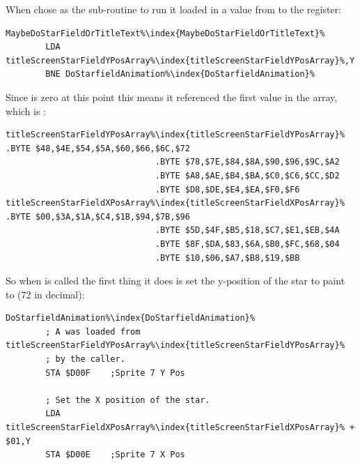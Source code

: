 When  chose  as the sub-routine to run it loaded in a value
from  to the  register: 

\begin{lstlisting}[escapechar=\%]
MaybeDoStarFieldOrTitleText%\index{MaybeDoStarFieldOrTitleText}%   
        LDA titleScreenStarFieldYPosArray%\index{titleScreenStarFieldYPosArray}%,Y
        BNE DoStarfieldAnimation%\index{DoStarfieldAnimation}%
\end{lstlisting}

Since  is zero at this point this means it referenced the first value in the array, which is :
\begin{lstlisting}[escapechar=\%]
titleScreenStarFieldYPosArray%\index{titleScreenStarFieldYPosArray}% .BYTE $48,$4E,$54,$5A,$60,$66,$6C,$72
                              .BYTE $78,$7E,$84,$8A,$90,$96,$9C,$A2
                              .BYTE $A8,$AE,$B4,$BA,$C0,$C6,$CC,$D2
                              .BYTE $D8,$DE,$E4,$EA,$F0,$F6
titleScreenStarFieldXPosArray%\index{titleScreenStarFieldXPosArray}% .BYTE $00,$3A,$1A,$C4,$1B,$94,$7B,$96
                              .BYTE $5D,$4F,$B5,$18,$C7,$E1,$EB,$4A
                              .BYTE $8F,$DA,$83,$6A,$B0,$FC,$68,$04
                              .BYTE $10,$06,$A7,$B8,$19,$BB
\end{lstlisting}

So when  is called the first thing it does is set the y-position of the star to paint
to  (72 in decimal): 

\begin{lstlisting}[caption=The start of \icode{DoStarfieldAnimation\index{DoStarfieldAnimation}} responsible for painting stars.,escapechar=\%]
DoStarfieldAnimation%\index{DoStarfieldAnimation}%   
        ; A was loaded from titleScreenStarFieldYPosArray%\index{titleScreenStarFieldYPosArray}%
        ; by the caller.
        STA $D00F    ;Sprite 7 Y Pos

        ; Set the X position of the star.
        LDA titleScreenStarFieldXPosArray%\index{titleScreenStarFieldXPosArray}% + $01,Y
        STA $D00E    ;Sprite 7 X Pos

\end{lstlisting}


